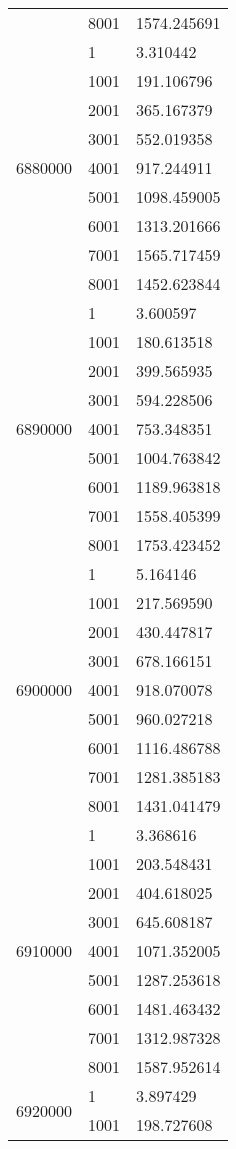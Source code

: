 \begin{table}[htb!]
\begin{tabular}{lll}
 & 8001 & 1574.245691 \\
\multirow[c]{9}{*}{6880000} & 1 & 3.310442 \\
 & 1001 & 191.106796 \\
 & 2001 & 365.167379 \\
 & 3001 & 552.019358 \\
 & 4001 & 917.244911 \\
 & 5001 & 1098.459005 \\
 & 6001 & 1313.201666 \\
 & 7001 & 1565.717459 \\
 & 8001 & 1452.623844 \\
\multirow[c]{9}{*}{6890000} & 1 & 3.600597 \\
 & 1001 & 180.613518 \\
 & 2001 & 399.565935 \\
 & 3001 & 594.228506 \\
 & 4001 & 753.348351 \\
 & 5001 & 1004.763842 \\
 & 6001 & 1189.963818 \\
 & 7001 & 1558.405399 \\
 & 8001 & 1753.423452 \\
\multirow[c]{9}{*}{6900000} & 1 & 5.164146 \\
 & 1001 & 217.569590 \\
 & 2001 & 430.447817 \\
 & 3001 & 678.166151 \\
 & 4001 & 918.070078 \\
 & 5001 & 960.027218 \\
 & 6001 & 1116.486788 \\
 & 7001 & 1281.385183 \\
 & 8001 & 1431.041479 \\
\multirow[c]{9}{*}{6910000} & 1 & 3.368616 \\
 & 1001 & 203.548431 \\
 & 2001 & 404.618025 \\
 & 3001 & 645.608187 \\
 & 4001 & 1071.352005 \\
 & 5001 & 1287.253618 \\
 & 6001 & 1481.463432 \\
 & 7001 & 1312.987328 \\
 & 8001 & 1587.952614 \\
\multirow[c]{9}{*}{6920000} & 1 & 3.897429 \\
 & 1001 & 198.727608 \\

\end{tabular}
\end{table}
